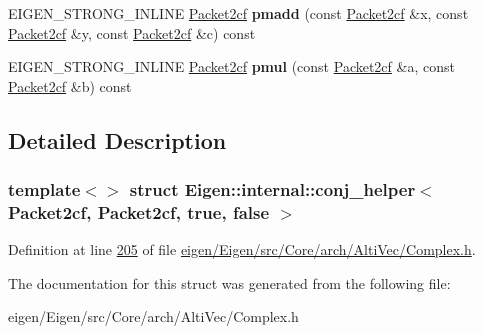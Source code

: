 \begin{DoxyCompactItemize}
E\+I\+G\+E\+N\+\_\+\+S\+T\+R\+O\+N\+G\+\_\+\+I\+N\+L\+I\+NE \hyperlink{struct_eigen_1_1internal_1_1_packet2cf}{Packet2cf} {\bfseries pmadd} (const \hyperlink{struct_eigen_1_1internal_1_1_packet2cf}{Packet2cf} \&x, const \hyperlink{struct_eigen_1_1internal_1_1_packet2cf}{Packet2cf} \&y, const \hyperlink{struct_eigen_1_1internal_1_1_packet2cf}{Packet2cf} \&c) const
\item 
\mbox{\label{struct_eigen_1_1internal_1_1conj__helper_3_01_packet2cf_00_01_packet2cf_00_01true_00_01false_01_4_a09374613c0b962776ac245738c43f36b}} 
E\+I\+G\+E\+N\+\_\+\+S\+T\+R\+O\+N\+G\+\_\+\+I\+N\+L\+I\+NE \hyperlink{struct_eigen_1_1internal_1_1_packet2cf}{Packet2cf} {\bfseries pmul} (const \hyperlink{struct_eigen_1_1internal_1_1_packet2cf}{Packet2cf} \&a, const \hyperlink{struct_eigen_1_1internal_1_1_packet2cf}{Packet2cf} \&b) const
\end{DoxyCompactItemize}


\subsection{Detailed Description}
\subsubsection*{template$<$$>$\newline
struct Eigen\+::internal\+::conj\+\_\+helper$<$ Packet2cf, Packet2cf, true, false $>$}



Definition at line \hyperlink{eigen_2_eigen_2src_2_core_2arch_2_alti_vec_2_complex_8h_source_l00205}{205} of file \hyperlink{eigen_2_eigen_2src_2_core_2arch_2_alti_vec_2_complex_8h_source}{eigen/\+Eigen/src/\+Core/arch/\+Alti\+Vec/\+Complex.\+h}.



The documentation for this struct was generated from the following file\+:\begin{DoxyCompactItemize}
\item 
eigen/\+Eigen/src/\+Core/arch/\+Alti\+Vec/\+Complex.\+h\end{DoxyCompactItemize}
